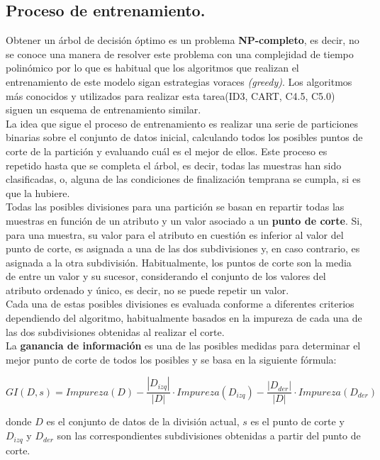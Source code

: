 \subsection{Proceso de entrenamiento.} 

Obtener un árbol de decisión óptimo es un problema \textbf{NP-completo}, es decir, no se conoce una manera de resolver este problema con una complejidad de tiempo polinómico por lo que es habitual que los algoritmos que realizan el entrenamiento de este modelo sigan estrategias voraces \textit{(greedy)}. Los algoritmos más conocidos y utilizados para realizar esta tarea(ID3, CART, C4.5, C5.0) siguen un esquema de entrenamiento similar. \\

La idea que sigue el proceso de entrenamiento es realizar una serie de particiones binarias sobre el conjunto de datos inicial, calculando todos los posibles puntos de corte de la partición y evaluando cuál es el mejor de ellos. Este proceso es repetido hasta que se completa el árbol, es decir, todas las muestras han sido clasificadas, o, alguna de las condiciones de finalización temprana se cumpla, si es que la hubiere.\\

Todas las posibles divisiones para una partición se basan en repartir todas las muestras en función de un atributo y un valor asociado a un \textbf{punto de corte}. Si, para una muestra, su valor para el atributo en cuestión es inferior al valor del punto de corte, es asignada a una de las dos subdivisiones y, en caso contrario, es asignada a la otra subdivisión. Habitualmente, los puntos de corte son la media de entre un valor y su sucesor, considerando el conjunto de los valores del atributo ordenado y único, es decir, no se puede repetir un valor.\\

Cada una de estas posibles divisiones es evaluada conforme a diferentes criterios dependiendo del algoritmo, habitualmente basados en la impureza de cada una de las dos subdivisiones obtenidas al realizar el corte. \\

La \textbf{ganancia de información} es una de las posibles medidas para determinar el mejor punto de corte de todos los posibles y se basa en la siguiente fórmula:

$$
GI(D,s) = Impureza(D) - \frac{|D_{izq}|}{|D|} \cdot Impureza(D_{izq}) - \frac{|D_{der}|}{|D|} \cdot Impureza(D_{der})
$$

donde $D$ es el conjunto de datos de la división actual, $s$ es el punto de corte y $D_{izq}$ y $D_{der}$ son las correspondientes subdivisiones obtenidas a partir del punto de corte.\\

